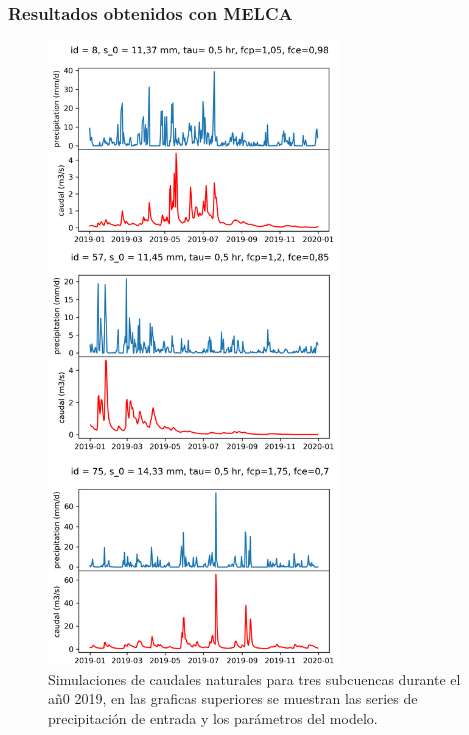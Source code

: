 \subsubsection{Resultados obtenidos con MELCA}



  

\begin{figure}[h!]
    \begin{center}
      \includegraphics[height=6.5in]{Figures/outputs_MELCA.png}
      \caption{ Simulaciones de caudales naturales para tres subcuencas durante el añ0 2019, 
      en las graficas superiores se muestran las series de 
      precipitación de entrada y los parámetros del modelo.}
      \label{5}
    \end{center}
  \end{figure}

